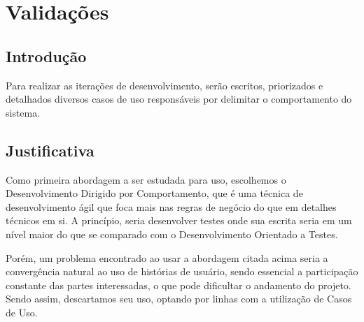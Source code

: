 \chapter{Validações}

\section{Introdução}
Para realizar as iterações de desenvolvimento, serão escritos, priorizados e detalhados diversos casos de uso responsáveis por delimitar o comportamento do sistema.

\section{Justificativa}
Como primeira abordagem a ser estudada para uso, escolhemos o Desenvolvimento Dirigido por Comportamento, que é uma técnica de desenvolvimento ágil que foca mais nas regras de negócio do que em detalhes técnicos em si. A princípio, seria desenvolver testes onde sua escrita seria em um nível maior do que se comparado com o Desenvolvimento Orientado a Testes.

Porém, um problema encontrado ao usar a abordagem citada acima seria a convergência natural ao uso de histórias de usuário, sendo essencial a participação constante das partes interessadas, o que pode dificultar o andamento do projeto. Sendo assim, descartamos seu uso, optando por linhas com a utilização de Casos de Uso.
